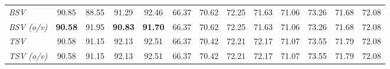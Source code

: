 \begin{table*}[t]
\begin{tabular}{@{}l|cccccccccccc@{}}
\textit{BSV} & 90.85 & 88.55 & 91.29 & \multicolumn{1}{c|}{92.46} & 66.37 & 70.62 & 72.25 & \multicolumn{1}{c|}{71.63} & 71.06 & 73.26 & 71.68 & 72.08 \\
\textit{BSV (o/v)} & \textbf{90.58} & 91.95 & \textbf{90.83} & \multicolumn{1}{c|}{\textbf{91.70}} & 66.37 & 70.62 & 72.25 & \multicolumn{1}{c|}{71.63} & 71.06 & 73.26 & 71.68 & 72.08 \\ \midrule
\textit{TSV} & 90.58 & 91.15 & 92.13 & \multicolumn{1}{c|}{92.51} & 66.37 & 70.42 & 72.21 & \multicolumn{1}{c|}{72.17} & 71.07 & 73.55 & 71.79 & 72.08 \\
\textit{TSV (o/v)} & 90.58 & 91.15 & 92.13 & \multicolumn{1}{c|}{92.51} & 66.37 & 70.42 & 72.21 & \multicolumn{1}{c|}{72.17} & 71.07 & 73.55 & 71.79 & 72.08 \\ \bottomrule
\end{tabular}
\end{table*}

